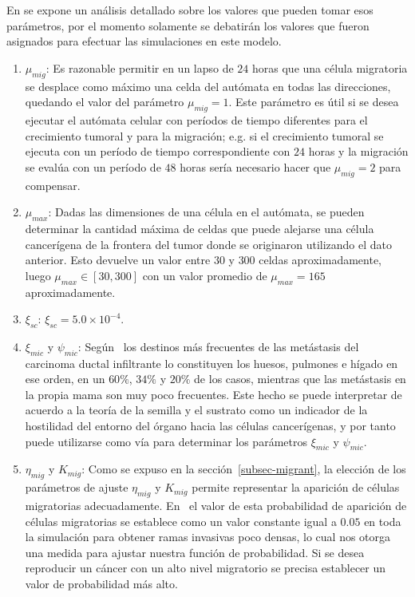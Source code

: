 En \cite{viabarre2019}  se expone un an\'alisis detallado sobre los valores que pueden tomar esos par\'ametros, por el momento solamente se debatir\'an los valores que fueron asignados para efectuar las simulaciones en este modelo.
\begin{enumerate}
    \item $\mu_{mig}$: Es razonable permitir en un lapso de $24$ horas que una c\'elula migratoria se desplace como m\'aximo una celda del aut\'omata en todas las direcciones, quedando el valor del par\'ametro $\mu_{mig} = 1$. Este par\'ametro es \'util si se desea ejecutar el aut\'omata celular con per\'iodos de tiempo diferentes para el crecimiento tumoral y para la migraci\'on; e.g. si el crecimiento tumoral se ejecuta con un per\'iodo de tiempo correspondiente con $24$ horas y la migraci\'on se eval\'ua con un per\'iodo de $48$ horas ser\'ia necesario hacer que $\mu_{mig} = 2$ para compensar.
    \item $\mu_{max}$:  Dadas las dimensiones de una c\'elula en el aut\'omata, se pueden determinar la cantidad m\'axima de celdas que puede alejarse una c\'elula cancer\'igena de la frontera del tumor donde se originaron utilizando el dato anterior. Esto devuelve un valor entre $30$ y $300$ celdas aproximadamente, luego $\mu_{max} \in [30,300]$ con un valor promedio de $\mu_{max} = 165$ aproximadamente.
    \item $\xi_{sc}$: $\xi_{sc} = 5$.$0 \times 10^{-4}$.
    \item $\xi_{mic}$ y $\psi_{mic}$: Seg\'un~\cite{kuhn,isogenic} los destinos m\'as frecuentes de las met\'astasis del carcinoma ductal infiltrante lo constituyen los huesos, pulmones e h\'igado en ese orden, en un $60\%$, $34\%$ y $20\%$ de los casos, mientras que las met\'astasis en la propia mama son muy poco frecuentes. Este hecho se puede interpretar de acuerdo a la teor\'ia de la semilla y el sustrato como un indicador de la hostilidad del entorno del \'organo hacia las c\'elulas cancer\'igenas, y por tanto puede utilizarse como v\'ia para determinar los par\'ametros $\xi_{mic}$ y $\psi_{mic}$. 
    \item  $\eta_{mig}$ y $K_{mig}$: Como se expuso en la secci\'on~\ref{subsec-migrant}, la elecci\'on de los par\'ametros de ajuste $\eta_{mig}$ y $K_{mig}$ permite representar la aparici\'on de c\'elulas migratorias adecuadamente. En~\cite{kansal3} el valor de esta probabilidad de aparici\'on de c\'elulas migratorias se establece como un valor constante igual a $0$.$05$ en toda la simulaci\'on para obtener ramas invasivas poco densas, lo cual nos otorga una medida para ajustar nuestra funci\'on de probabilidad. Si se desea reproducir un c\'ancer con un alto nivel migratorio se precisa establecer un valor de probabilidad m\'as alto.
\end{enumerate}


